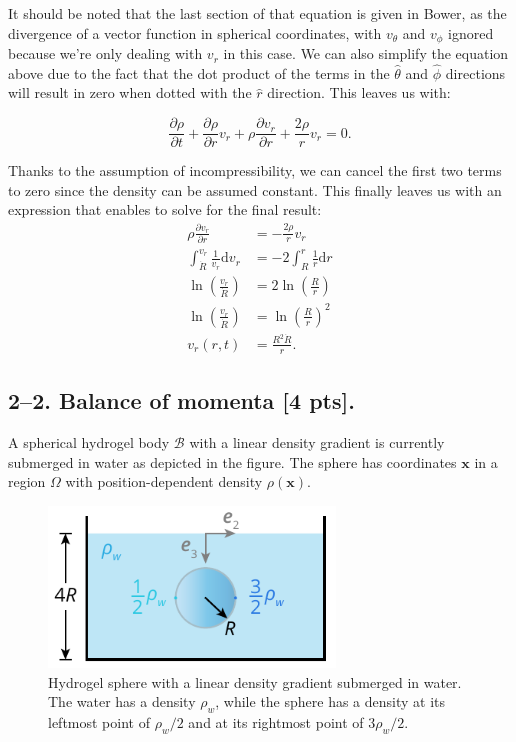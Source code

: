 It should be noted that the last section of that equation is given in Bower, as the divergence of a vector function in spherical coordinates, with $v_\theta$ and $v_\phi$ ignored because we're only dealing with $v_r$ in this case. We can also simplify the equation above due to the fact that the dot product of the terms in the $\hat{\theta}$ and $\hat{\phi}$ directions will result in zero when dotted with the $\hat{r}$ direction. This leaves us with:

\begin{equation*}
    \frac{\partial \rho}{\partial t} + \frac{\partial \rho}{\partial r} v_r + \rho \frac{\partial v_r}{\partial r} + \frac{2\rho}{r}v_r = 0.
\end{equation*}

Thanks to the assumption of incompressibility, we can cancel the first two terms to zero since the density can be assumed constant. This finally leaves us with an expression that enables to solve for the final result:
\begin{align*}
    \rho \frac{\partial v_r}{\partial r} &= -\frac{2\rho}{r}v_r\\
    \int_{\dot R}^{v_r} \frac{1}{v_r} \textrm{d}v_r &= -2 \int_R^r \frac{1}{r} \textrm{d}r\\
    \ln\left(\frac{v_r}{\dot R}\right) &= 2\ln\left(\frac{R}{r}\right)\\
    \ln\left(\frac{v_r}{\dot R}\right) &= \ln \left(\frac{R}{r}\right)^2\\
    v_r(r,t) &= \frac{R^2 \dot R}{r}.
\end{align*}

\medskip
\newpage
\subsection*{2--2. \textbf{Balance of momenta} [4 pts].} A spherical hydrogel body $\mathcal{B}$ with a linear density gradient is currently submerged in water as depicted in the figure. 
The sphere has coordinates $\bm{x}$ in a region $\Omega$ with position-dependent density $\rho(\bm{x})$. 

\begin{figure}[H]
\vspace{-2em}
\centering
\includegraphics[width=3in]{instr-figures/PS2-Q1.pdf}
\caption{\small{Hydrogel sphere with a linear density gradient submerged in water. The water has a density $\rho_w$, while the sphere has a density at its leftmost point of $\rho_w/2$ and at its rightmost point of $3\rho_w/2$.}}
\end{figure}

